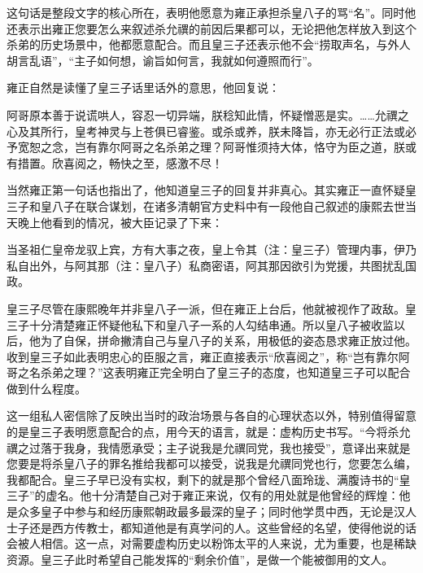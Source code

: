 
这句话是整段文字的核心所在，表明他愿意为雍正承担杀皇八子的骂“名”。同时他还表示出雍正您要怎么来叙述杀允禩的前因后果都可以，无论把他怎样放入到这个杀弟的历史场景中，他都愿意配合。而且皇三子还表示他不会“捞取声名，与外人胡言乱语”，“主子如何想，谕旨如何言，我就如何遵照而行”。



雍正自然是读懂了皇三子话里话外的意思，他回复说：



\begin{bookquote}阿哥原本善于说谎哄人，容忍一切异端，朕稔知此情，怀疑憎恶是实。……允禩之心及其所行，皇考神灵与上苍俱已睿鉴。或杀或养，朕未降旨，亦无必行正法或必予宽恕之念，岂有靠尔阿哥之名杀弟之理？阿哥惟须持大体，恪守为臣之道，朕或有措置。欣喜阅之，畅快之至，感激不尽！\end{bookquote}


当然雍正第一句话也指出了，他知道皇三子的回复并非真心。其实雍正一直怀疑皇三子和皇八子在联合谋划，在诸多清朝官方史料中有一段他自己叙述的康熙去世当天晚上他看到的情况，被大臣记录了下来：



\begin{bookquote}当圣祖仁皇帝龙驭上宾，方有大事之夜，皇上令其（注：皇三子）管理内事，伊乃私自出外，与阿其那（注：皇八子）私商密语，阿其那因欲引为党援，共图扰乱国政。\end{bookquote}


皇三子尽管在康熙晚年并非皇八子一派，但在雍正上台后，他就被视作了政敌。皇三子十分清楚雍正怀疑他私下和皇八子一系的人勾结串通。所以皇八子被收监以后，他为了自保，拼命撇清自己与皇八子的关系，用极低的姿态恳求雍正放过他。收到皇三子如此表明忠心的臣服之言，雍正直接表示“欣喜阅之”，称“岂有靠尔阿哥之名杀弟之理？”这表明雍正完全明白了皇三子的态度，也知道皇三子可以配合做到什么程度。



这一组私人密信除了反映出当时的政治场景与各自的心理状态以外，特别值得留意的是皇三子表明愿意配合的点，用今天的语言，就是：虚构历史书写。“今将杀允禩之过落于我身，我情愿承受；主子说我是允禩同党，我也接受”，意译出来就是您要是将杀皇八子的罪名推给我都可以接受，说我是允禩同党也行，您要怎么编，我都配合。皇三子早已没有实权，剩下的就是那个曾经八面玲珑、满腹诗书的“皇三子”的虚名。他十分清楚自己对于雍正来说，仅有的用处就是他曾经的辉煌：他是众多皇子中参与和经历康熙朝政最多最深的皇子；同时他学贯中西，无论是汉人士子还是西方传教士，都知道他是有真学问的人。这些曾经的名望，使得他说的话会被人相信。这一点，对需要虚构历史以粉饰太平的人来说，尤为重要，也是稀缺资源。皇三子此时希望自己能发挥的“剩余价值”，是做一个能被御用的文人。


